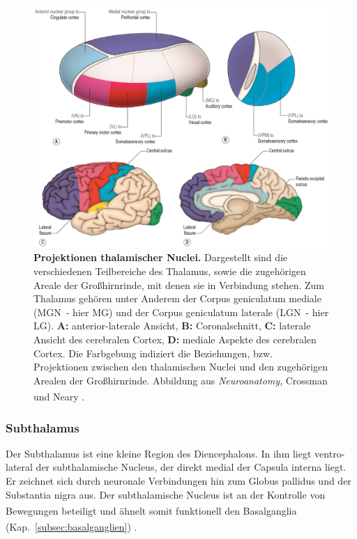 \documentclass[12pt,a4paper,pdftex]{article}
\begin{document}
\begin{figure}[H]
    \centering
    \includegraphics[width=\textwidth]{pictures/Bilder_Jule/Andere/thalamus.png}
    \caption[Projektionen thalamischer Nuclei]{\textbf{Projektionen thalamischer Nuclei.} Dargestellt sind die verschiedenen Teilbereiche des Thalamus, sowie die zugehörigen Areale der Großhirnrinde, mit denen sie in Verbindung stehen. Zum Thalamus gehören unter Anderem der Corpus geniculatum mediale (MGN~- hier MG) und der Corpus geniculatum laterale (LGN~- hier LG). \textbf{A:} anterior-laterale Ansicht, \textbf{B:} Coronalschnitt, \textbf{C:} laterale Ansicht des cerebralen Cortex, \textbf{D:} mediale Aspekte des cerebralen Cortex. Die Farbgebung indiziert die Beziehungen, bzw. Projektionen zwischen den thalamischen Nuclei und den zugehörigen Arealen der Großhirnrinde. Abbildung aus \textit{Neuroanatomy}, Crossman und Neary \textsuperscript{\cite[12]{crossman2014neuroanatomy}}.}
    \label{fig:thalamus_nuclei}
\end{figure}

\subsubsection{Subthalamus} 

Der Subthalamus ist eine kleine Region des Diencephalons. In ihm liegt ventro-lateral der subthalamische Nucleus, der direkt medial der Capsula interna liegt. Er zeichnet sich durch neuronale Verbindungen hin zum Globus pallidus und der Substantia nigra aus. Der subthalamische Nucleus ist an der Kontrolle von Bewegungen beteiligt \textsuperscript{\cite[12]{crossman2014neuroanatomy}} und ähnelt somit funktionell den Basalganglia (Kap.~\ref{subsec:basalganglien}) \textsuperscript{\cite[16]{crossman2014neuroanatomy}}.
\end{document}
